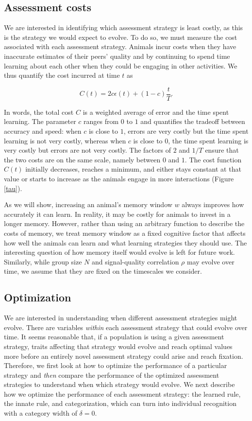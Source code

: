 \subsection{Assessment costs }
We are interested in identifying which assessment strategy is least costly, as this is the strategy we would expect to evolve. To do so, we must measure the cost associated with each assessment strategy. Animals incur costs when they have inaccurate estimates of their peers' quality and by continuing to spend time learning about each other when they could be engaging in other activities. We thus quantify the cost incurred at time $t$ as 
\begin{linenomath*}
\begin{equation*}
C(t) = 2c\epsilon(t) +(1-c)\frac{t}{T}.
\end{equation*}  
\end{linenomath*}
In words, the total cost $C$ is a weighted average of error and the time spent learning. The parameter $c$ ranges from $0$ to $1$ and quantifies the tradeoff between accuracy and speed: when $c$ is close to $1$, errors are very costly but the time spent learning is not very costly, whereas when $c$ is close to $0$, the time spent learning is very costly but errors are not very costly. The factors of $2$ and $1/T$ ensure that the two costs are on the same scale, namely between $0$ and $1$. 
The cost function $C(t)$ initially decreases, reaches a minimum, and either stays constant at that value or starts to increase as the animals engage in more interactions (Figure \ref{tau}). 

As we will show, increasing an animal's memory window $w$ always improves how accurately it can learn. In reality, it may be costly for animals to invest in a longer memory. However, rather than using an arbitrary function to describe the costs of memory, we treat memory window as a fixed cognitive factor that affects how well the animals can learn and what learning strategies they should use. The interesting question of how memory itself would evolve is left for future work. Similarly, while group size $N$ and signal-quality correlation $\rho$ may evolve over time, we assume that they are fixed on the timescales we consider. 


\subsection{Optimization }
We are interested in understanding when different assessment strategies might evolve. There are variables \emph{within} each assessment strategy that could evolve over time. It seems reasonable that, if a population is using a given assessment strategy, traits affecting that strategy would evolve and reach optimal values more before an entirely novel assessment strategy could arise and reach fixation. Therefore, we first look at how to optimize the performance of a particular strategy and \emph{then} compare the performance of the optimized assessment strategies to understand when which strategy would evolve. We next describe how we optimize the performance of each assessment strategy: the learned rule, the innate rule, and categorization, which can turn into individual recognition with a category width of $\delta=0$.

